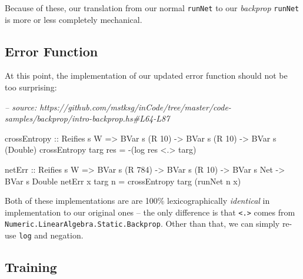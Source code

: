 \documentclass[]{article}
\newenvironment{Shaded}{}{}
\newcommand{\CommentTok}[1]{\textcolor[rgb]{0.38,0.63,0.69}{\textit{#1}}}
\newcommand{\DataTypeTok}[1]{\textcolor[rgb]{0.56,0.13,0.00}{#1}}
\newcommand{\DecValTok}[1]{\textcolor[rgb]{0.25,0.63,0.44}{#1}}
\newcommand{\FunctionTok}[1]{\textcolor[rgb]{0.02,0.16,0.49}{#1}}
\newcommand{\NormalTok}[1]{#1}
\newcommand{\OtherTok}[1]{\textcolor[rgb]{0.00,0.44,0.13}{#1}}
\begin{document}
Because of these, our translation from our normal \texttt{runNet} to our
\emph{backprop} \texttt{runNet} is more or less completely mechanical.

\hypertarget{error-function-1}{%
\subsection{Error Function}\label{error-function-1}}

At this point, the implementation of our updated error function should not be
too surprising:

\begin{Shaded}
\begin{Highlighting}[]
\CommentTok{-- source: https://github.com/mstksg/inCode/tree/master/code-samples/backprop/intro-backprop.hs#L64-L87}

\NormalTok{crossEntropy}
\OtherTok{    ::} \DataTypeTok{Reifies}\NormalTok{ s }\DataTypeTok{W}
    \OtherTok{=>} \DataTypeTok{BVar}\NormalTok{ s (}\DataTypeTok{R} \DecValTok{10}\NormalTok{)}
    \OtherTok{->} \DataTypeTok{BVar}\NormalTok{ s (}\DataTypeTok{R} \DecValTok{10}\NormalTok{)}
    \OtherTok{->} \DataTypeTok{BVar}\NormalTok{ s (}\DataTypeTok{Double}\NormalTok{)}
\NormalTok{crossEntropy targ res }\FunctionTok{=} \FunctionTok{-}\NormalTok{(log res }\FunctionTok{<.>}\NormalTok{ targ)}

\NormalTok{netErr}
\OtherTok{    ::} \DataTypeTok{Reifies}\NormalTok{ s }\DataTypeTok{W}
    \OtherTok{=>} \DataTypeTok{BVar}\NormalTok{ s (}\DataTypeTok{R} \DecValTok{784}\NormalTok{)}
    \OtherTok{->} \DataTypeTok{BVar}\NormalTok{ s (}\DataTypeTok{R} \DecValTok{10}\NormalTok{)}
    \OtherTok{->} \DataTypeTok{BVar}\NormalTok{ s }\DataTypeTok{Net}
    \OtherTok{->} \DataTypeTok{BVar}\NormalTok{ s }\DataTypeTok{Double}
\NormalTok{netErr x targ n }\FunctionTok{=}\NormalTok{ crossEntropy targ (runNet n x)}
\end{Highlighting}
\end{Shaded}

Both of these implementations are are 100\% lexicographically \emph{identical}
in implementation to our original ones -- the only difference is that
\texttt{\textless{}.\textgreater{}} comes from
\texttt{Numeric.LinearAlgebra.Static.Backprop}. Other than that, we can simply
re-use \texttt{log} and negation.

\hypertarget{training-1}{%
\subsection{Training}\label{training-1}}
\end{document}
